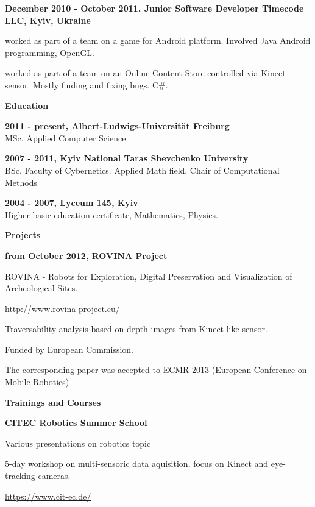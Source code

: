 \documentclass[a4paper,12pt,final]{memoir}
\newcommand{\Sep}{\vspace{1.5em}}
\newcommand{\SmallSep}{\vspace{0.5em}}
\newcommand{\CVSection}[1]
	{\Large\textbf{#1}\par
	\SmallSep\normalsize\normalfont}
\newcommand{\CVItem}[1]
	{\textbf{\color{MidnightBlue} #1}}
\begin{document}
\CVItem{December 2010 - October 2011, Junior Software Developer
\newline Timecode LLC, Kyiv, Ukraine}
\begin{compactitem}[\color{MidnightBlue}$\circ$]
\item worked as part of a team on a game for Android platform. Involved Java Android programming, OpenGL.
\item worked as part of a team on an Online Content Store controlled via Kinect sensor. Mostly finding and fixing bugs. C\#.
\end{compactitem}
\Sep

\CVSection{Education}
\CVItem{2011 - present, Albert-Ludwigs-Universität Freiburg}\\
MSc. Applied Computer Science
\SmallSep

\CVItem{2007 - 2011, Kyiv National Taras Shevchenko University}\\
BSc. Faculty of Cybernetics. Applied Math field. 
\newline Chair of Computational Methods
\SmallSep

\CVItem{2004 - 2007, Lyceum 145, Kyiv}\\
Higher basic education certificate, Mathematics, Physics.
\Sep
\framebreak
\clearpage
\framebreak
\framebreak

\CVSection{Projects}
\CVItem{from October 2012, ROVINA Project}
\begin{compactitem}[\color{MidnightBlue}$\circ$]
	\item ROVINA - Robots for Exploration, Digital Preservation and Visualization of Archeological Sites.
	\item \href{http://www.rovina-project.eu/}{http://www.rovina-project.eu/} 
	\item Traversability analysis based on depth images from Kinect-like sensor.
	\item Funded by European Commission.
	\item The corresponding paper was accepted to ECMR 2013 (European Conference on Mobile Robotics)
\end{compactitem}
\SmallSep

\CVSection{Trainings and Courses}
\CVItem{CITEC Robotics Summer School}
\begin{compactitem}[\color{MidnightBlue}$\circ$]
	\item Various presentations on robotics topic
	\item 5-day workshop on multi-sensoric data aquisition, focus on Kinect and eye-tracking cameras.
	\item \href{https://www.cit-ec.de/}{https://www.cit-ec.de/} 
\end{compactitem}
\SmallSep
\end{document}
